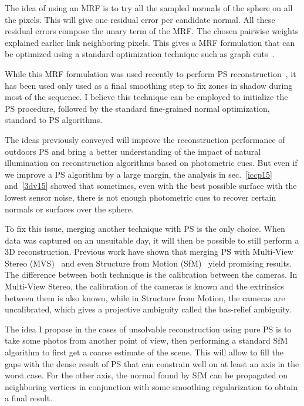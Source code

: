 The idea of using an MRF is to try all the sampled normals of the sphere on all the pixels. This will give one residual error per candidate normal. All these residual errors compose the unary term of the MRF. The chosen pairwise weights explained earlier link neighboring pixels. This gives a MRF formulation that can be optimized using a standard optimization technique such as graph cuts~\cite{Boykov2001a,Kolmogorov2004a,Boykov2004,Bagon2006}.

While this MRF formulation was used recently to perform PS reconstruction~\cite{jung-cvpr-15}, it has been used only used as a final smoothing step to fix zones in shadow during most of the sequence. I believe this technique can be employed to initialize the PS procedure, followed by the standard fine-grained normal optimization, standard to PS algorithms.


The ideas previously conveyed will improve the reconstruction performance of outdoors PS and bring a better understanding of the impact of natural illumination on reconstruction algorithms based on photometric cues. But even if we improve a PS algorithm by a large margin, the analysis in sec.~\ref{iccp15} and~\ref{3dv15} showed that sometimes, even with the best possible surface with the lowest sensor noise, there is not enough photometric cues to recover certain normals or surfaces over the sphere.

To fix this issue, merging another technique with PS is the only choice. When data was captured on an unsuitable day, it will then be possible to still perform a 3D reconstruction. Previous work have shown that merging PS with Multi-View Stereo (MVS)~\cite{Beljan2012,Zhou2013,ackermann-3dv-14,HernandezEsteban2008,inose-tcva-13,shi-3dv-14} and even Structure from Motion (SfM)~\cite{zhang-iccv-03,lim-iccv-05} yield promising results. The difference between both technique is the calibration between the cameras. In Multi-View Stereo, the calibration of the cameras is known and the extrinsics between them is also known, while in Structure from Motion, the cameras are uncalibrated, which gives a projective ambiguity called the bas-relief ambiguity.

The idea I propose in the cases of unsolvable reconstruction using pure PS is to take some photos from another point of view, then performing a standard SfM algorithm to first get a coarse estimate of the scene. This will allow to fill the gaps with the dense result of PS that can constrain well on at least an axis in the worst case. For the other axis, the normal found by SfM can be propagated on neighboring vertices in conjunction with some smoothing regularization to obtain a final result.

